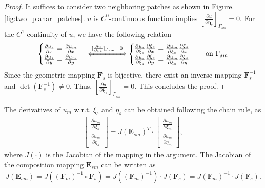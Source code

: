 \documentclass[preprint,12pt]{elsarticle}
\theoremstyle{remark}
\begin{document}
\begin{proof}
    It suffices to consider two neighboring patches as shown in Figure. \ref{fig:two_planar_patches}. $u$ is $C^0$-continuous function implies $[\frac{\partial{u}}{\partial{\mathbf{\eta}_s}}]_{\Gamma_{sm}}=0$. For the $C^1$-continuity of $u$, we have the following relation 
    \begin{align}
        \begin{cases}
            \frac{\partial{u_s}}{\partial{x}}=\frac{\partial{u_m}}{\partial{x}}\\
            \frac{\partial{u_s}}{\partial{y}}=\frac{\partial{u_m}}{\partial{y}}
        \end{cases}
        \xLeftrightarrow{[\frac{\partial{u}}{\partial{\mathbf{\eta}_s}}]_{\Gamma_{sm}}=0}
        \begin{cases}
            \frac{\partial{u}_s}{\partial{\xi_s}}\frac{\partial\xi_s}{\partial{x}}=\frac{\partial{u_m}}{\partial{\xi_s}}\frac{\partial\xi_s}{\partial{x}}\\
            \frac{\partial{u}_s}{\partial{\xi_s}}\frac{\partial\xi_s}{\partial{y}}=\frac{\partial{u_m}}{\partial{\xi_s}}\frac{\partial\xi_s}{\partial{y}}
        \end{cases} \quad \text{on $\Gamma_{sm}$}
    \end{align}
    Since the geometric mapping $\mathbf{F}_s$ is bijective, there exist an inverse mapping $\mathbf{F}_s^{-1}$ and $\det({\mathbf{F}_s^{-1}})\neq{0}$. Thus, $[\frac{\partial{u}}{\partial{\mathbf{\xi}_s}}]_{\Gamma_{sm}}=0$. This concludes the proof.
\end{proof}
The derivatives of $u_m$ w.r.t. $\xi_s$ and $\eta_s$ can be obtained following the chain rule, as
\begin{align}
    \begin{bmatrix}
        \tfrac{\partial{u_m}}{\partial{\xi_s}}\\
        \tfrac{\partial{u_m}}{\partial{\eta_s}}
    \end{bmatrix}
    =
    J(\mathbf{E}_{sm})^T\cdot
    \begin{bmatrix}
        \tfrac{\partial{u_m}}{\partial{\xi_m}}\\
        \tfrac{\partial{u_m}}{\partial{\eta_m}}
    \end{bmatrix},
\end{align}
where $J(\cdot)$ is the Jacobian of the mapping in the argument. The Jacobian of the composition mapping $\mathbf{E}_{sm}$ can be written as
\begin{equation}
    J(\mathbf{E}_{sm})=J(\left(\mathbf{F}_{m}\right)^{-1}\circ\mathbf{F}_{s})=J(\left(\mathbf{F}_{m}\right)^{-1})\cdot{}J(\mathbf{F}_{s})=J(\mathbf{F}_{m})^{-1}\cdot{}J(\mathbf{F}_{s}).
\end{equation}
\end{document}
